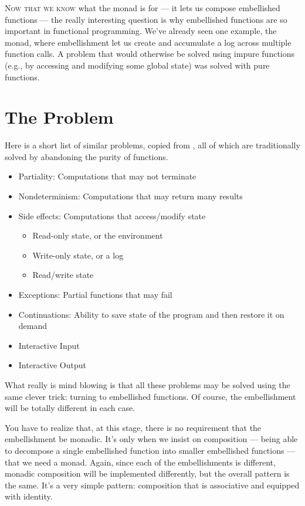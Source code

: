 
\lettrine[lhang=0.17]{N}{ow that we know} what the monad is for --- it lets us compose
embellished functions --- the really interesting question is why
embellished functions are so important in functional programming. We've
already seen one example, the  monad, where embellishment
let us create and accumulate a log across multiple function calls. A
problem that would otherwise be solved using impure functions (e.g., by
accessing and modifying some global state) was solved with pure
functions.

\section{The Problem}

Here is a short list of similar problems, copied from
, all of which are traditionally solved by abandoning the
purity of functions.

\begin{itemize}
\tightlist
\item
  Partiality: Computations that may not terminate
\item
  Nondeterminism: Computations that may return many results
\item
  Side effects: Computations that access/modify state

  \begin{itemize}
  \tightlist
  \item
    Read-only state, or the environment
  \item
    Write-only state, or a log
  \item
    Read/write state
  \end{itemize}
\item
  Exceptions: Partial functions that may fail
\item
  Continuations: Ability to save state of the program and then restore
  it on demand
\item
  Interactive Input
\item
  Interactive Output
\end{itemize}

What really is mind blowing is that all these problems may be solved
using the same clever trick: turning to embellished functions. Of
course, the embellishment will be totally different in each case.

You have to realize that, at this stage, there is no requirement that
the embellishment be monadic. It's only when we insist on composition
--- being able to decompose a single embellished function into smaller
embellished functions --- that we need a monad. Again, since each of the
embellishments is different, monadic composition will be implemented
differently, but the overall pattern is the same. It's a very simple
pattern: composition that is associative and equipped with identity.

